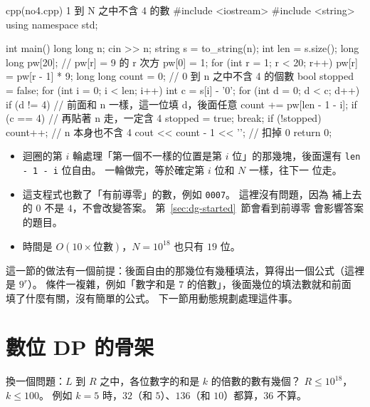 \begin{example}[label=ex:dg-no4]{cpp}{(no4.cpp) 1 到 N 之中不含 4 的數}
#include <iostream>
#include <string>
using namespace std;

int main() {
    long long n;
    cin >> n;
    string s = to_string(n);
    int len = s.size();
    long long pw[20];                 // pw[r] = 9 的 r 次方
    pw[0] = 1;
    for (int r = 1; r < 20; r++) {
        pw[r] = pw[r - 1] * 9;
    }
    long long count = 0;              // 0 到 n 之中不含 4 的個數
    bool stopped = false;
    for (int i = 0; i < len; i++) {
        int c = s[i] - '0';
        for (int d = 0; d < c; d++) {
            if (d != 4) {
                // 前面和 n 一樣，這一位填 d，後面任意
                count += pw[len - 1 - i];
            }
        }
        if (c == 4) {                 // 再貼著 n 走，一定含 4
            stopped = true;
            break;
        }
    }
    if (!stopped) {
        count++;                      // n 本身也不含 4
    }
    cout << count - 1 << '\n';        // 扣掉 0
    return 0;
}
\end{example}


\begin{itemize}
\item 迴圈的第 $i$ 輪處理「第一個不一樣的位置是第 $i$ 位」的那幾塊，後面還有
\texttt{len - 1 - i} 位自由。 一輪做完，等於確定第 $i$ 位和 $N$ 一樣，往下一
位走。
\item 這支程式也數了「有前導零」的數，例如 \texttt{0007}。 這裡沒有問題，因為
補上去的 $0$ 不是 $4$，不會改變答案。 第~\ref{sec:dg-started}~節會看到前導零
會影響答案的題目。
\item 時間是 $O(10 \times \text{位數})$，$N = 10^{18}$ 也只有 $19$ 位。
\end{itemize}

這一節的做法有一個前提：後面自由的那幾位有幾種填法，算得出一個公式（這裡是
$9^r$）。 條件一複雜，例如「數字和是 $7$ 的倍數」，後面幾位的填法數就和前面
填了什麼有關，沒有簡單的公式。 下一節用動態規劃處理這件事。

\section{數位 DP 的骨架}
\label{sec:dg-skeleton}

換一個問題：$L$ 到 $R$ 之中，各位數字的和是 $k$ 的倍數的數有幾個？
$R \le 10^{18}$，$k \le 100$。 例如 $k = 5$ 時，$32$（和 $5$）、$136$（和
$10$）都算，$36$ 不算。

